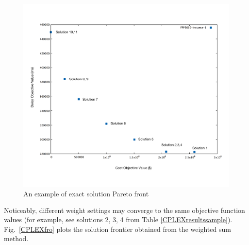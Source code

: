 \documentclass[10pt,journal,compsoc]{IEEEtran}
\newcommand{\Fig}[1]{Fig.~\ref{#1}}
\begin{document}
\begin{figure}[H]
\centerline{\includegraphics[width=5.5in]{FPP3010-instance1png.png}}
\caption{An example of exact solution Pareto front} 
\label{espf}
\end{figure}
\fi

Noticeably, %
different weight settings may converge to the same objective function values (for example, see solutions 2, 3, 4 from Table \ref{CPLEXresultssample}). \Fig{CPLEXfro} plots the solution frontier obtained from the weighted sum method. 
\end{document}
